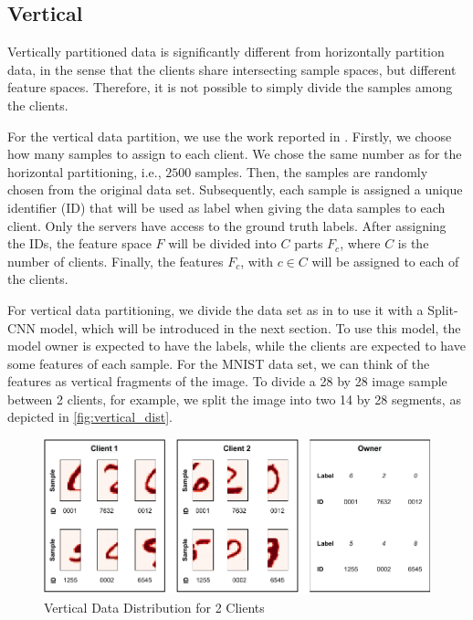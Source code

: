 \subsection{Vertical}\label{subsection:verticalpartitioning}

Vertically partitioned data is significantly different from horizontally partition data, in the sense that the clients share intersecting sample spaces, but different feature spaces. Therefore, it is not possible to simply divide the samples among the clients.

For the vertical data partition, we use the work reported in \cite{10.48550/arxiv.2104.00489}. Firstly, we choose how many samples to assign to each client. We chose the same number as for the horizontal partitioning, i.e., $2500$ samples. Then, the samples are randomly chosen from the original data set. Subsequently, each sample is assigned a unique identifier (ID) that will be used as label when giving the data samples to each client. Only the servers have access to the ground truth labels. After assigning the IDs, the feature space $F$ will be divided into $C$ parts $F_c$, where $C$ is the number of clients. Finally, the features $F_c$, with $c \in C$ will be assigned to each of the clients.

For vertical data partitioning, we divide the data set as in \cite{10.48550/arxiv.2104.00489} to use it with a Split-CNN \cite{10.1145/3297858.3304038} model, which will be introduced in the next section. To use this model, the model owner is expected to have the labels, while the clients are expected to have some features of each sample. For the MNIST data set, we can think of the features as vertical fragments of the image. To divide a 28 by 28 image sample between 2 clients, for example, we split the image into two 14 by 28 segments, as depicted in \autoref{fig:vertical_dist}.

\begin{figure}[!ht]
    \centering
    \centering
    \includegraphics[width=1\textwidth]{graphics/vertical_partitioning.pdf}
    \caption{Vertical Data Distribution for 2 Clients}
    \label{fig:vertical_dist}
\end{figure}


